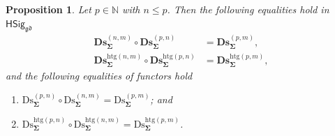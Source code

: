 \documentclass[a4paper, reqno]{amsbook}
\newcommand{\sig}[1]{\mathbf{#1}}             %
\newcommand{\gd}{\mathfrak{gd}}              %
\newcommand{\htg}{\mathrm{htg}}                %
\newcommand{\Ds}{\mathrm{Ds}}
\newcommand{\bDs}{\mathbf{Ds}}
\theoremstyle{plain}
\newtheorem{proposition}[theorem]{Proposition}
\theoremstyle{definition}
\begin{document}
\begin{proposition}\label{PDsDerivorComp}
Let $p\in\mathbb{N}$ with $n\leq p$.
Then the following equalities hold in $\mathsf{HSig}_{\gd}$
\begin{align*}
\bDs^{(n,m)}_{\sig{\Sigma}}\circ\bDs^{(p,n)}_{\sig{\Sigma}}&=\bDs^{(p,m)}_{\sig{\Sigma}},\\
\bDs^{\htg(n,m)}_{\sig{\Sigma}}\circ\bDs^{\htg(p,n)}_{\sig{\Sigma}}&=\bDs^{\htg(p,m)}_{\sig{\Sigma}},
\end{align*}
and the following equalities of functors hold
\begin{enumerate}
	\item
	$\Ds^{(p,n)}_{\sig{\Sigma}}\circ\Ds^{(n,m)}_{\sig{\Sigma}}=\Ds^{(p,m)}_{\sig{\Sigma}}$; and

	\item
	$\Ds^{\htg(p,n)}_{\sig{\Sigma}}\circ\Ds^{\htg(n,m)}_{\sig{\Sigma}}=\Ds^{\htg(p,m)}_{\sig{\Sigma}}$.
\end{enumerate}
\end{proposition}
\end{document}
